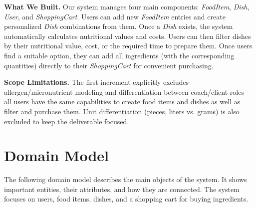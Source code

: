 \documentclass[11pt]{article}
\begin{document}
\textbf{What We Built.} Our system manages four main components: \textit{FoodItem}, \textit{Dish}, \textit{User}, and \textit{ShoppingCart}. Users can add new \textit{FoodItem} entries and create personalized \textit{Dish} combinations from them. Once a \textit{Dish} exists, the system automatically calculates nutritional values and costs. Users can then filter dishes by their nutritional value, cost, or the required time to prepare them. Once users find a suitable option, they can add all ingredients (with the corresponding quantities) directly to their \textit{ShoppingCart} for convenient purchasing.



\textbf{Scope Limitations.} The first increment explicitly excludes allergen/micronutrient modeling and differentiation between coach/client roles – all users have the same capabilities to create food items and dishes as well as filter and purchase them. 
Unit differentiation (pieces, liters vs. grams) is also excluded to keep the deliverable focused.

\section{Domain Model}

The following domain model describes the main objects of the system. 
It shows important entities, their attributes, and how they are connected. 
The system focuses on users, food items, dishes, and a shopping cart for buying ingredients.
\end{document}
